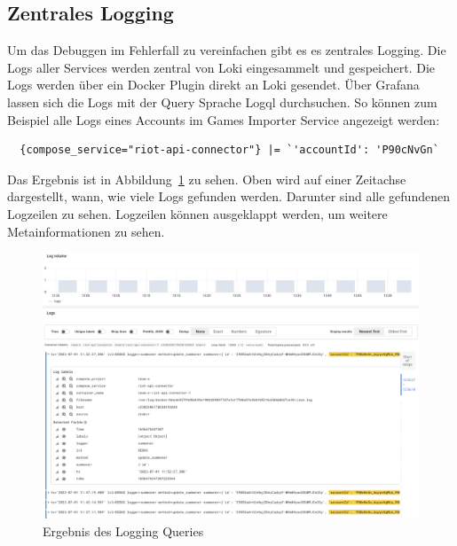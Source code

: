 \subsection{Zentrales Logging}

Um das Debuggen im Fehlerfall zu vereinfachen gibt es es zentrales Logging.
Die Logs aller Services werden zentral von Loki eingesammelt und gespeichert.
Die Logs werden über ein Docker Plugin direkt an Loki gesendet.
Über Grafana lassen sich die Logs mit der Query Sprache Logql durchsuchen.
So können zum Beispiel alle Logs eines Accounts im Games Importer Service angezeigt werden:

\begin{lstlisting}
  {compose_service="riot-api-connector"} |= `'accountId': 'P90cNvGn`
\end{lstlisting}

Das Ergebnis ist in Abbildung~\ref{fig:logging} zu sehen.
Oben wird auf einer Zeitachse dargestellt, wann, wie viele Logs gefunden werden.
Darunter sind alle gefundenen Logzeilen zu sehen.
Logzeilen können ausgeklappt werden, um weitere Metainformationen zu sehen.

\begin{figure}
    \centering
    \includegraphics[width=\textwidth]{images/logging}
    \caption{Ergebnis des Logging Queries}
    \label{fig:logging}
\end{figure}